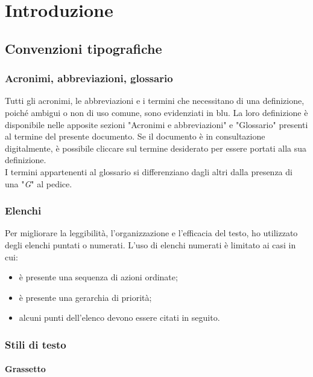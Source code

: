 \chapter{Introduzione}
\label{cap:introduzione}

\section{Convenzioni tipografiche}

\subsection{Acronimi, abbreviazioni, glossario}

Tutti gli acronimi, le abbreviazioni e i termini che necessitano di una definizione, poiché ambigui o non di uso comune, sono evidenziati in blu. La loro definizione è disponibile nelle apposite sezioni "Acronimi e abbreviazioni" e "Glossario" presenti al termine del presente documento. Se il documento è in consultazione digitalmente, è possibile cliccare sul termine desiderato per essere portati alla sua definizione.\\
I termini appartenenti al glossario si differenziano dagli altri dalla presenza di una "\textit{G}" al pedice.

\subsection{Elenchi}

Per migliorare la leggibilità, l'organizzazione e l'efficacia del testo, ho utilizzato degli elenchi puntati o numerati. L'uso di elenchi numerati è limitato ai casi in cui:
\begin{itemize}
    \item è presente una sequenza di azioni ordinate;
    \item è presente una gerarchia di priorità;
    \item alcuni punti dell'elenco devono essere citati in seguito.
\end{itemize}

\subsection{Stili di testo}

\subsubsection{\textbf{Grassetto}}

